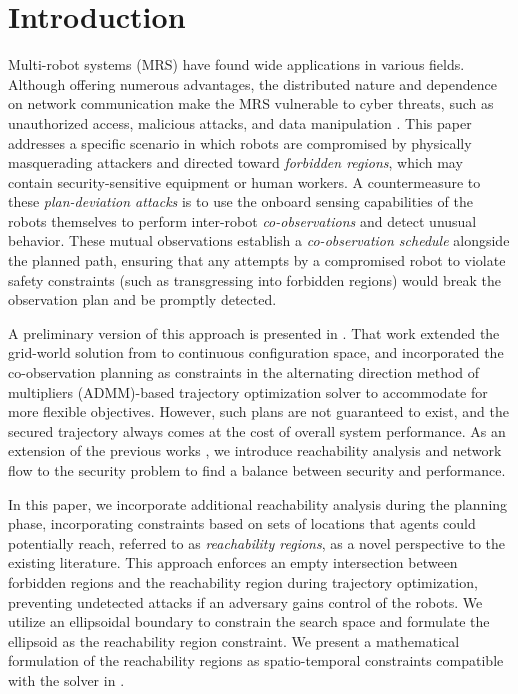 \documentclass[10pt,twocolumn,twoside]{IEEEtran}
\begin{document}
\section{Introduction}\label{sec:introduction}
Multi-robot systems (MRS) have found wide applications in various fields. Although offering numerous advantages, the distributed nature and dependence on network communication make the MRS vulnerable to cyber threats, such as unauthorized access, malicious attacks, and data manipulation \cite{brunner2010infiltrating}. This paper addresses a specific scenario in which robots are compromised by physically masquerading attackers and directed toward \emph{forbidden regions}, which may contain security-sensitive equipment or human workers. A countermeasure to these \emph{plan-deviation attacks} \cite{wardega2019resilience, wardega2023byzantine, wardega2023hola} is to use the onboard sensing capabilities of the robots themselves to perform inter-robot \emph{co-observations} and detect unusual behavior. These mutual observations establish a \emph{co-observation schedule} alongside the planned path, ensuring that any attempts by a compromised robot to violate safety constraints (such as transgressing into forbidden regions) would break the observation plan and be promptly detected.

A preliminary version of this approach is presented in \cite{yang2020multi,yang2021multi}. That work extended the grid-world solution from \cite{wardega2019resilience} to continuous configuration space, and incorporated the co-observation planning as constraints in the alternating direction method of multipliers (ADMM)-based trajectory optimization solver to accommodate for more flexible objectives. However, such plans are not guaranteed to exist, and the secured trajectory always comes at the cost of overall system performance. As an extension of the previous works \cite{yang2020multi,yang2021multi}, we introduce reachability analysis and network flow to the security problem to find a balance between security and performance.

In this paper, we incorporate additional reachability analysis during the planning phase, incorporating constraints based on sets of locations that agents could potentially reach, referred to as \emph{reachability regions}, as a novel perspective to the existing literature. This approach enforces an empty intersection between forbidden regions and the reachability region during trajectory optimization, preventing undetected attacks if an adversary gains control of the robots. We utilize an ellipsoidal boundary to constrain the search space and formulate the ellipsoid as the reachability region constraint. We present a mathematical formulation of the reachability regions as spatio-temporal constraints compatible with the solver in \cite{yang2020multi}. 
\end{document}
